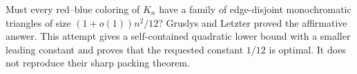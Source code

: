 Must every red--blue coloring of $K_n$ have a family of edge-disjoint
monochromatic triangles of size $(1+o(1))n^2/12$?
Gruslys and Letzter proved the affirmative answer. This attempt gives
a self-contained quadratic lower bound with a smaller leading
constant and proves that the requested constant $1/12$ is optimal.
It does not reproduce their sharp packing theorem.
